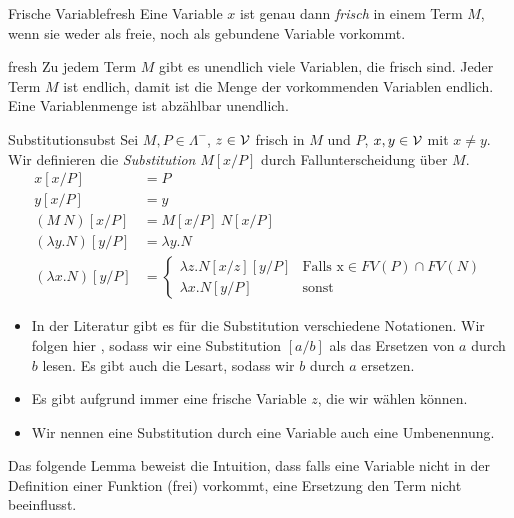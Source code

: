\begin{definition}{Frische Variable}{fresh}
    Eine Variable $x$ ist genau dann \emph{frisch} in einem Term $M$, wenn sie weder als freie, noch als gebundene Variable vorkommt.
\end{definition}
\begin{proposition}{}{fresh}
    Zu jedem Term $M$ gibt es unendlich viele Variablen, die frisch sind.
    \Proof Jeder Term $M$ ist endlich, damit ist die Menge der vorkommenden Variablen endlich. Eine Variablenmenge \V{} ist abzählbar unendlich.    
\end{proposition}
\begin{definition}{Substitution}{subst}
    Sei $M, P\in\Lambda^-$, $z\in\mathcal{V}$ frisch in $M$ und $P$, $x,y\in\mathcal{V}$ mit $x\neq y$. Wir definieren die \emph{Substitution} $M[x/P]$ durch Fallunterscheidung über $M$.
    \begin{align*}
    x[x/P] &= P\\
    y[x/P] &= y\\
    (M~N)[x/P] &= M[x/P]~N[x/P]\\
    (\lambda y.N)[y/P] &= \lambda y.N\\
    (\lambda x.N)[y/P] &=\begin{cases}
    \lambda z.N[x/z][y/P]& \text{Falls x}\in FV(P)\cap FV(N)\\
    \lambda x.N[y/P]& \text{sonst}
    \end{cases}
    \end{align*}
\end{definition}
\begin{remark}
    \begin{itemize}
        \item In der Literatur gibt es für die Substitution verschiedene Notationen. Wir folgen hier \cite{Troelstra1996}, sodass wir eine Substitution $[a/b]$ als das Ersetzen von $a$ durch $b$ lesen. Es gibt auch die Lesart, sodass wir $b$ durch $a$ ersetzen.\cite{curry}
    \item Es gibt aufgrund  immer eine frische Variable $z$, die wir wählen können.
        \item Wir nennen eine Substitution durch eine Variable auch eine Umbenennung.
        \end{itemize}    
\end{remark}

Das folgende Lemma beweist die Intuition, dass falls eine Variable nicht in der Definition einer Funktion (frei) vorkommt, eine Ersetzung den Term nicht beeinflusst.

